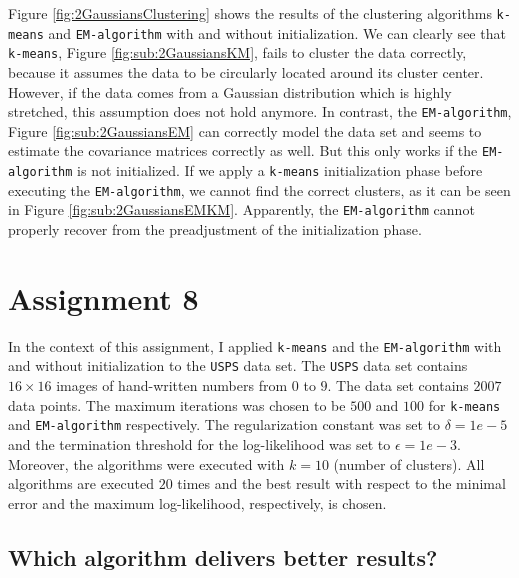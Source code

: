 \documentclass[a4paper, 12pt, titlepage]{article}
\begin{document}
Figure \ref{fig:2GaussiansClustering} shows the results of the clustering algorithms \texttt{k-means} and \texttt{EM-algorithm} with and without initialization.
We can clearly see that \texttt{k-means}, Figure \ref{fig:sub:2GaussiansKM}, fails to cluster the data correctly, because it assumes the data to be circularly located around its cluster center.
However, if the data comes from a Gaussian distribution which is highly stretched, this assumption does not hold anymore.
In contrast, the \texttt{EM-algorithm}, Figure \ref{fig:sub:2GaussiansEM} can correctly model the data set and seems to estimate the covariance matrices correctly as well.
But this only works if the \texttt{EM-algorithm} is not initialized.
If we apply a \texttt{k-means} initialization phase before executing the \texttt{EM-algorithm}, we cannot find the correct clusters, as it can be seen in Figure \ref{fig:sub:2GaussiansEMKM}.
Apparently, the \texttt{EM-algorithm} cannot properly recover from the preadjustment of the initialization phase.

\section{Assignment 8}

In the context of this assignment, I applied \texttt{k-means} and the \texttt{EM-algorithm} with and without initialization to the \texttt{USPS} data set.
The \texttt{USPS} data set contains $16\times 16$ images of hand-written numbers from $0$ to $9$.
The data set contains $2007$ data points.
The maximum iterations was chosen to be $500$ and $100$ for \texttt{k-means} and \texttt{EM-algorithm} respectively.
The regularization constant was set to $\delta=1e-5$ and the termination threshold for the log-likelihood was set to $\epsilon=1e-3$.
Moreover, the algorithms were executed with $k=10$ (number of clusters).
All algorithms are executed $20$ times and the best result with respect to the minimal error and the maximum log-likelihood, respectively, is chosen.

\subsection{Which algorithm delivers better results?}
\end{document}
